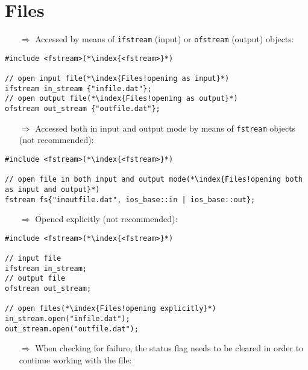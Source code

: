 \documentclass[10pt]{article}
\begin{document}
\section{Files}
\small
\begin{enumerate}
\item[$\Rightarrow$] Accessed by means of \texttt{ifstream} (input) or
\texttt{ofstream} (output) objects:
\end{enumerate}
\begin{lstlisting}
#include <fstream>(*\index{<fstream>}*)

// open input file(*\index{Files!opening as input}*)
ifstream in_stream {"infile.dat"};
// open output file(*\index{Files!opening as output}*)
ofstream out_stream {"outfile.dat"};
\end{lstlisting}
\begin{enumerate}
\item[$\Rightarrow$] Accessed both in input and output mode by means of \texttt{fstream} objects (not recommended):
\end{enumerate}
\begin{lstlisting}
#include <fstream>(*\index{<fstream>}*)

// open file in both input and output mode(*\index{Files!opening both as input and output}*)
fstream fs{"inoutfile.dat", ios_base::in | ios_base::out};
\end{lstlisting}
\begin{enumerate}
\item[$\Rightarrow$] Opened explicitly (not recommended):
\end{enumerate}
\begin{lstlisting}
#include <fstream>(*\index{<fstream>}*)

// input file 
ifstream in_stream;
// output file
ofstream out_stream;

// open files(*\index{Files!opening explicitly}*)
in_stream.open("infile.dat");
out_stream.open("outfile.dat");
\end{lstlisting}
\begin{enumerate}
\item[$\Rightarrow$] When checking for failure, the status flag needs to be cleared
in order to continue working with the file:
\end{enumerate}
\end{document}
